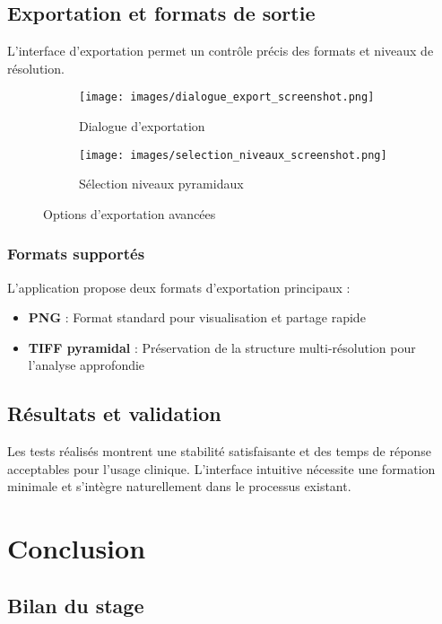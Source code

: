 \documentclass[12pt,a4paper]{report}
\begin{document}
\section{Exportation et formats de sortie}

L'interface d'exportation permet un contrôle précis des formats et niveaux de résolution.

\begin{figure}[h!]
\centering
\begin{subfigure}{0.48\textwidth}
\texttt{[image: images/dialogue\_export\_screenshot.png]}
\caption{Dialogue d'exportation}
\end{subfigure}
\hfill
\begin{subfigure}{0.48\textwidth}
\texttt{[image: images/selection\_niveaux\_screenshot.png]}
\caption{Sélection niveaux pyramidaux}
\end{subfigure}
\caption{Options d'exportation avancées}
\end{figure}

\subsection{Formats supportés}

L'application propose deux formats d'exportation principaux :

\begin{itemize}
\item \textbf{PNG} : Format standard pour visualisation et partage rapide
\item \textbf{TIFF pyramidal} : Préservation de la structure multi-résolution pour l'analyse approfondie
\end{itemize}

\section{Résultats et validation}

Les tests réalisés montrent une stabilité satisfaisante et des temps de réponse acceptables pour l'usage clinique. L'interface intuitive nécessite une formation minimale et s'intègre naturellement dans le processus existant.

\chapter{Conclusion}

\section{Bilan du stage}
\end{document}
